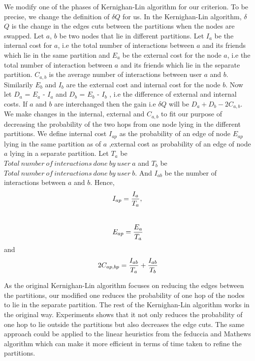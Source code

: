 \documentclass[letterpaper]{article}
\begin{document}
    We modify one of the phases of  Kernighan-Lin algorithm for our criterion.
To be precise, we change the definition of $\delta$$Q$ for us. In the
Kernighan-Lin algorithm, $\delta$$Q$ is the change in the edges cuts between
the partitions when the nodes are swapped. Let $a$, $b$ be two nodes that lie
in different partitions. Let $I_a$ be the internal cost for $a$, i.e the total
number of interactions between $a$ and its friends which lie in the same
partition and  $E_a$ be the external cost for the node $a$, i.e the total
number of interaction between $a$ and its friends which lie in the separate
partition. $C_{a,b}$ is the average number of interactions
between user $a$ and $b$. Similarily $E_b$ and $I_b$ are the external cost and internal cost
for the node $b$. Now let $D_a$ = $E_a$ - $I_a$ and $D_b$ = $E_b$
- $I_b$ , i.e the difference of external and internal costs. If $a$ and $b$ are
  interchanged then the gain i.e $\delta$$Q$ will be $D_a + D_b -2C_{a,b}$. We
make changes in the internal, external and $C_{a,b}$ to fit our purpose of
decreasing the probability of the two hops from one node lying in the different
partitions. We define internal cost $I_{ap}$ as the probability of an edge of
node $E_{ap}$ lying in the same partition as of $a$ ,external cost as
probability of an edge of node $a$ lying in a separate partition. Let $T_a$ be
$Total\ number\ of\ interactions\ done\ by\ user\ a$ and $T_b$ be $Total\
number\ of\ interactions\ done\ by\ user\ b$. And $I_{ab}$ be the number of
interactions between $a$ and $b$. Hence,\\
\begin{displaymath}I_{ap}=\frac{I_a}{T_a},\\\end{displaymath}
\\\begin{displaymath}E_{ap}=\frac{E_a}{T_a}\\\end{displaymath} and\\
\begin{displaymath}2C_{ap,bp}=\frac{I_{ab}}{T_a}+\frac{I_{ab}}{T_b}\\\end{displaymath}


    As the original Kernighan-Lin algorithm focuses on reducing the edges
between the partitions, our modified one reduces the probability of one hop of
the nodes to lie in the separate partition.  The rest of the Kernighan-Lin
algorithm works in the original way. Experiments shows that it not only reduces
the probability of one hop to lie outside the partitions but also decreases the
edge cuts. The same approach could be applied to the linear heuristics from the
feduccia and Mathews algorithm\cite{23} which can make it more efficient in
terms of time taken to refine the partitions.
 
\end{document}
